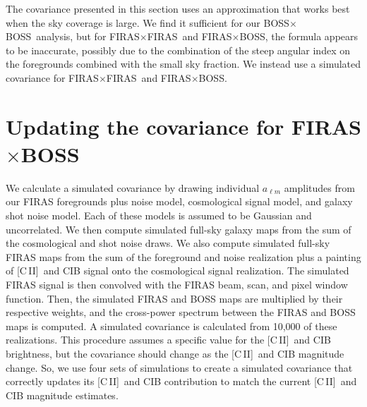 \documentclass[fleqn,usenatbib]{mnras}
\newcommand{\cii}{[C{\sc\,II}]}
\newcommand{\FF}{FIRAS${\times}$FIRAS}
\newcommand{\BB}{BOSS${\times}$BOSS}
\newcommand{\FB}{FIRAS${\times}$BOSS}
\begin{document}
The covariance presented in this section uses an approximation that works best when the sky coverage is large. We find it sufficient for our \BB\ analysis, but for \FF\ and \FB, the formula appears to be inaccurate, possibly due to the combination of the steep angular index on the foregrounds combined with the small sky fraction. We instead use a simulated covariance for \FF\ and \FB.

\section{Updating the covariance for \texorpdfstring{\FB}{FIRASxBOSS}}
\label{sec:Appendix_B}
We calculate a simulated covariance by drawing individual $a_{\ell m}$ amplitudes from our FIRAS foregrounds plus noise model, cosmological signal model, and galaxy shot noise model. Each of these models is assumed to be Gaussian and uncorrelated. We then compute simulated full-sky galaxy maps from the sum of the cosmological and shot noise draws. We also compute simulated full-sky FIRAS maps from the sum of the foreground and noise realization plus a painting of \cii\ and CIB signal onto the cosmological signal realization. The simulated FIRAS signal is then convolved with the FIRAS beam, scan, and pixel window function. Then, the simulated FIRAS and BOSS maps are multiplied by their respective weights, and the cross-power spectrum between the FIRAS and BOSS maps is computed. A simulated covariance is calculated from 10,000 of these realizations. This procedure assumes a specific value for the \cii\ and CIB brightness, but the covariance should change as the \cii\ and CIB magnitude change. So, we use four sets of simulations to create a simulated covariance that correctly updates its \cii\ and CIB contribution to match the current \cii\ and CIB magnitude estimates.
\end{document}

